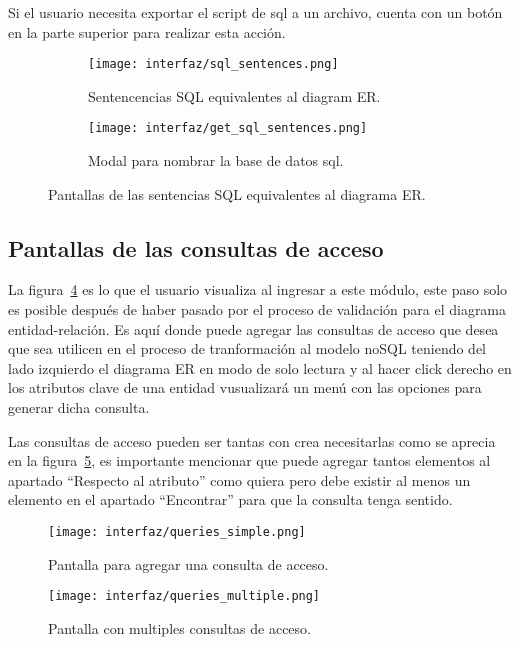Si el usuario necesita exportar el script de sql a un archivo, cuenta con un botón en la parte superior para realizar esta acción.

\begin{figure}[H]
    \begin{subfigure}[b]{0.49\textwidth}
        \texttt{[image: interfaz/sql\_sentences.png]}
        \caption{Sentencencias SQL equivalentes al diagram ER.}
        \label{img:app_sqlScript}
      \end{subfigure}
      \hfill
      \begin{subfigure}[b]{0.49\textwidth}
        \texttt{[image: interfaz/get\_sql\_sentences.png]}
        \caption{Modal para nombrar la base de datos sql.}
        \label{img:app_dbName}
      \end{subfigure}
    \caption{Pantallas de las sentencias SQL equivalentes al diagrama ER.}
    \label{img:app_sqlSentences}
\end{figure}

\subsection*{Pantallas de las consultas de acceso}

La figura~\ref{img:app_simpleQuery} es lo que el usuario visualiza al ingresar a este módulo, este paso solo es posible después de haber pasado por el proceso de validación para el diagrama entidad-relación. Es aquí donde puede agregar las consultas de acceso que desea que sea utilicen en el proceso de tranformación al modelo noSQL teniendo del lado izquierdo el diagrama ER en modo de solo lectura y al hacer click derecho en los atributos clave de una entidad vusualizará un menú con las opciones para generar dicha consulta.

Las consultas de acceso pueden ser tantas con crea necesitarlas como se aprecia en la figura~\ref{img:app_multipleQueries}, es importante mencionar que puede agregar tantos elementos al apartado ``Respecto al atributo'' como quiera pero debe existir al menos un elemento en el apartado ``Encontrar'' para que la consulta tenga sentido.

\begin{figure}[H]
    \centering
    \texttt{[image: interfaz/queries\_simple.png]}
    \caption{Pantalla para agregar una consulta de acceso.}
    \label{img:app_simpleQuery}
\end{figure}

\begin{figure}[H]
    \centering
    \texttt{[image: interfaz/queries\_multiple.png]}
    \caption{Pantalla con multiples consultas de acceso.}
    \label{img:app_multipleQueries}
\end{figure}


